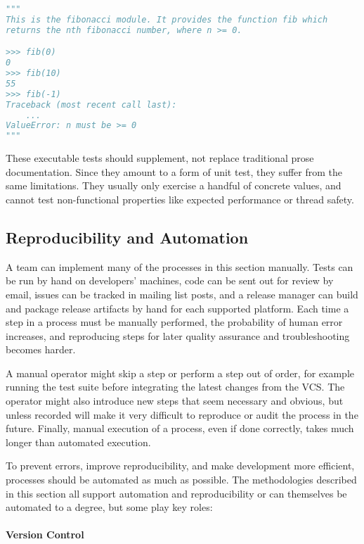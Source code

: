 \begin{lstlisting}[language=Python]
"""
This is the fibonacci module. It provides the function fib which
returns the nth fibonacci number, where n >= 0.

>>> fib(0)
0
>>> fib(10)
55
>>> fib(-1)
Traceback (most recent call last):
    ...
ValueError: n must be >= 0
"""
\end{lstlisting}

These executable tests should supplement, not replace traditional
prose documentation. Since they amount to a form of unit test, they
suffer from the same limitations. They usually only exercise a handful
of concrete values, and cannot test non-functional properties like
expected performance or thread safety.

\subsection{Reproducibility and Automation}

A team can implement many of the processes in this section
manually. Tests can be run by hand on developers' machines, code can
be sent out for review by email, issues can be tracked in mailing list
posts, and a release manager can build and package release artifacts
by hand for each supported platform. Each time a step in a process
must be manually performed, the probability of human error increases,
and reproducing steps for later quality assurance and troubleshooting
becomes harder.

A manual operator might skip a step or perform a step out of order,
for example running the test suite before integrating the latest
changes from the VCS. The operator might also introduce new steps that
seem necessary and obvious, but unless recorded will make it very
difficult to reproduce or audit the process in the future. Finally,
manual execution of a process, even if done correctly, takes much
longer than automated execution.

To prevent errors, improve reproducibility, and make development more
efficient, processes should be automated as much as possible. The
methodologies described in this section all support automation and
reproducibility or can themselves be automated to a degree, but some
play key roles:

\paragraph{Version Control}

